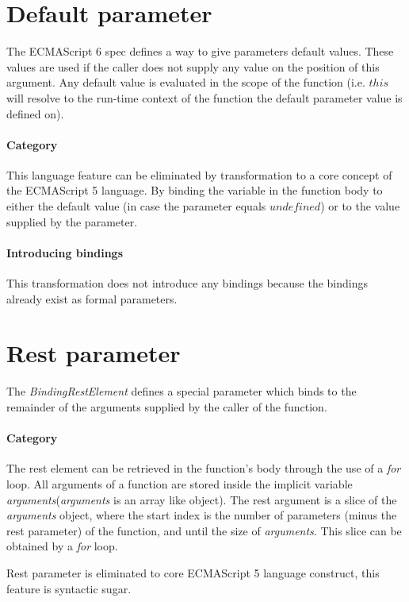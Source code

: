 \section{Default parameter}
The ECMAScript 6 spec defines a way to give parameters default values\cite[9.2.12]{SpecJS}. These values are used if the caller does not supply any value on the position of this argument. Any default value is evaluated in the scope of the function (i.e. $this$ will resolve to the run-time context of the function the default parameter value is defined on).

\paragraph{Category}
This language feature can be eliminated by transformation to a core concept of the ECMAScript 5 language. By binding the variable in the function body to either the default value (in case the parameter equals $undefined$) or to the value supplied by the parameter.

\paragraph{Introducing bindings}
This transformation does not introduce any bindings because the bindings already exist as formal parameters.

\section{Rest parameter}
The \textit{BindingRestElement} defines a special parameter which binds to the remainder of the arguments supplied by the caller of the function.\cite[14.1]{SpecJS}

\paragraph{Category}
The rest element can be retrieved in the function's body through the use of a \textit{for} loop. All arguments of a function are stored inside the implicit variable \textit{arguments}\footnotemark (\textit{arguments} is an array like object). The rest argument is a slice of the \textit{arguments} object, where the start index is the number of parameters (minus the rest parameter) of the function, and until the size of \textit{arguments}. This slice can be obtained by a \textit{for} loop.

Rest parameter is eliminated to core ECMAScript 5 language construct, this feature is syntactic sugar.

